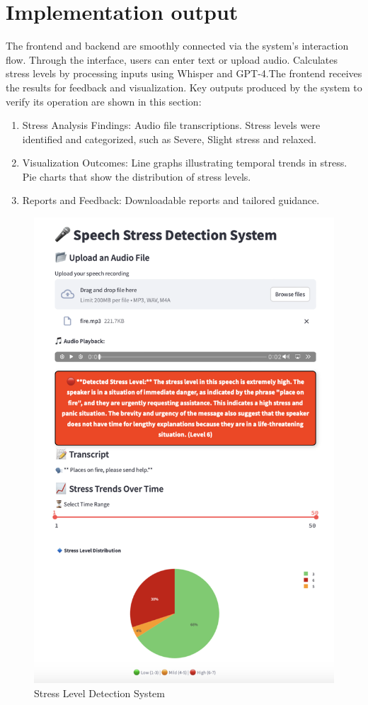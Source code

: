 \documentclass[Arial,12pt,openright,twoside]{book}
\begin{document}
 \section{Implementation output}
The frontend and backend are smoothly connected via the system's interaction flow. Through the interface, users can enter text or upload audio. Calculates stress levels by processing inputs using Whisper and GPT-4.The frontend receives the results for feedback and visualization. Key outputs produced by the system to verify its operation are shown in this section:
\begin{enumerate}
\item Stress Analysis Findings: Audio file transcriptions. 
Stress levels were identified and categorized, such as Severe, Slight stress and relaxed. 
\item Visualization Outcomes: Line graphs illustrating temporal trends in stress. 
Pie charts that show the distribution of stress levels. 
\item Reports and Feedback: Downloadable reports and tailored guidance.
\end{enumerate} 
 \begin{figure}[p]
    \centering
    \includegraphics[width=0.9\columnwidth]{aovrall1.png}
    \caption{Stress Level Detection System}
    \label{fig:system_architecture}
\end{figure} 
\end{document}
